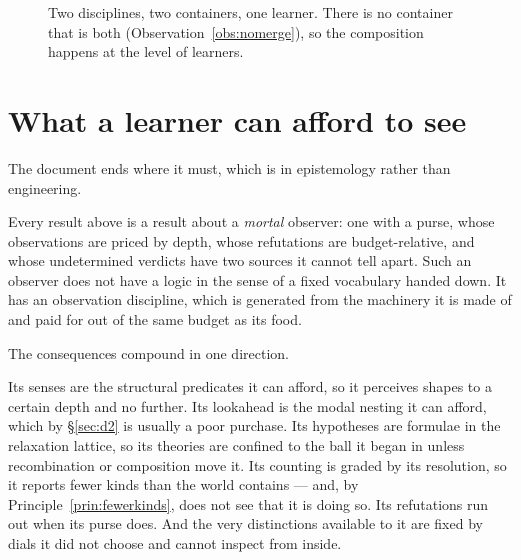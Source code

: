 \begin{figure}[h]
\centering
{}
\caption{Two disciplines, two containers, one learner. There is no container that
is both (Observation~\ref{obs:nomerge}), so the composition happens at the level
of learners.}
\label{fig:aggregate}
\end{figure}

\section{What a learner can afford to see}
\label{sec:afford}

The document ends where it must, which is in epistemology rather than engineering.

Every result above is a result about a \emph{mortal} observer: one with a purse,
whose observations are priced by depth, whose refutations are budget-relative, and
whose undetermined verdicts have two sources it cannot tell apart. Such an
observer does not have a logic in the sense of a fixed vocabulary handed down. It
has an observation discipline, which is generated from the machinery it is made
of and paid for out of the same budget as its food.

The consequences compound in one direction.

Its senses are the structural predicates it can afford, so it perceives shapes to
a certain depth and no further. Its lookahead is the modal nesting it can afford,
which by \S\ref{sec:d2} is usually a poor purchase. Its hypotheses are formulae in
the relaxation lattice, so its theories are confined to the ball it began in
unless recombination or composition move it. Its counting is graded by its
resolution, so it reports fewer kinds than the world contains --- and, by
Principle~\ref{prin:fewerkinds}, does not see that it is doing so. Its refutations
run out when its purse does. And the very distinctions available to it are fixed
by dials it did not choose and cannot inspect from inside.

